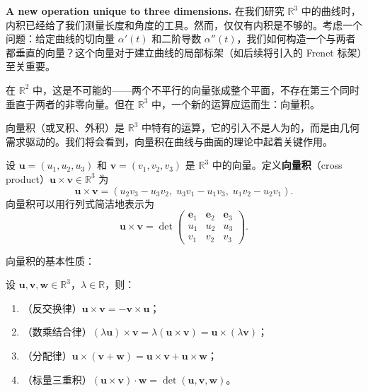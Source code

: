 \textbf{A new operation unique to three dimensions.} 在我们研究 $\mathbb{R}^3$ 中的曲线时，内积已经给了我们测量长度和角度的工具。然而，仅仅有内积是不够的。考虑一个问题：给定曲线的切向量 $\alpha'(t)$ 和二阶导数 $\alpha''(t)$，我们如何构造一个与两者都垂直的向量？这个向量对于建立曲线的局部标架（如后续将引入的 Frenet 标架）至关重要。

在 $\mathbb{R}^2$ 中，这是不可能的——两个不平行的向量张成整个平面，不存在第三个同时垂直于两者的非零向量。但在 $\mathbb{R}^3$ 中，一个新的运算应运而生：向量积。

向量积（或叉积、外积）是 $\mathbb{R}^3$ 中特有的运算，它的引入不是人为的，而是由几何需求驱动的。我们将会看到，向量积在曲线与曲面的理论中起着关键作用。

\begin{Definition}[向量积]\label{def:cross-product-ch1}
设 $\mathbf{u} = (u_1, u_2, u_3)$ 和 $\mathbf{v} = (v_1, v_2, v_3)$ 是 $\mathbb{R}^3$ 中的向量。定义\textbf{向量积}（cross product）$\mathbf{u} \times \mathbf{v} \in \mathbb{R}^3$ 为
\[
\mathbf{u} \times \mathbf{v} = (u_2 v_3 - u_3 v_2,\; u_3 v_1 - u_1 v_3,\; u_1 v_2 - u_2 v_1).
\]
向量积可以用行列式简洁地表示为
\[
\mathbf{u} \times \mathbf{v} = \det\begin{pmatrix}
\mathbf{e}_1 & \mathbf{e}_2 & \mathbf{e}_3 \\
u_1 & u_2 & u_3 \\
v_1 & v_2 & v_3
\end{pmatrix}.
\]
\end{Definition}

向量积的基本性质：

\begin{Proposition}[向量积的性质]\label{prop:cross-product-ch1}
设 $\mathbf{u}, \mathbf{v}, \mathbf{w} \in \mathbb{R}^3$，$\lambda \in \mathbb{R}$，则：
\begin{enumerate}
\item（反交换律）$\mathbf{u} \times \mathbf{v} = -\mathbf{v} \times \mathbf{u}$；
\item（数乘结合律）$(\lambda \mathbf{u}) \times \mathbf{v} = \lambda (\mathbf{u} \times \mathbf{v}) = \mathbf{u} \times (\lambda \mathbf{v})$；
\item（分配律）$\mathbf{u} \times (\mathbf{v} + \mathbf{w}) = \mathbf{u} \times \mathbf{v} + \mathbf{u} \times \mathbf{w}$；
\item（标量三重积）$(\mathbf{u} \times \mathbf{v}) \cdot \mathbf{w} = \det(\mathbf{u}, \mathbf{v}, \mathbf{w})$。
\end{enumerate}
\end{Proposition}

